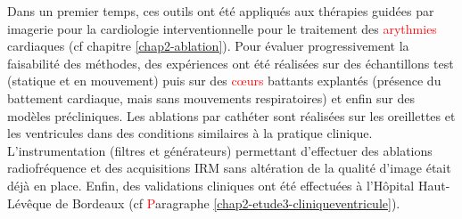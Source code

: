 Dans un premier temps, ces outils ont été appliqués aux thérapies guidées par imagerie pour la cardiologie interventionnelle pour le traitement des \textcolor{red}{arythmies} cardiaques (cf chapitre \ref{chap2-ablation}). Pour évaluer progressivement la faisabilité des méthodes, des expériences ont été réalisées sur des échantillons test (statique et en mouvement) puis sur des \textcolor{red}{cœurs} battants explantés (présence du battement cardiaque, mais sans mouvements respiratoires) et enfin sur des modèles précliniques. Les ablations par cathéter sont réalisées sur les oreillettes et les ventricules dans des conditions similaires à la pratique clinique. L’instrumentation (filtres et générateurs) permettant d’effectuer des ablations radiofréquence et des acquisitions IRM sans altération de la qualité d’image était déjà en place. Enfin, des validations cliniques ont été effectuées à l’Hôpital Haut-Lévêque de Bordeaux (cf \textcolor{red}{P}aragraphe \ref{chap2-etude3-cliniqueventricule}).\\